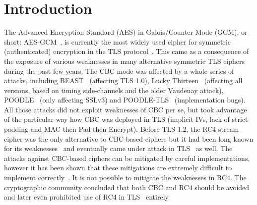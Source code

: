 %

\makeatletter
\def\blfootnote{\xdef\@thefnmark{}\@footnotetext}
\makeatother

%
\section{Introduction}
The Advanced Encryption Standard (AES) in Galois/Counter Mode (GCM), or short: AES-GCM~\cite{gcm,gcm-nist}, is currently the most widely used cipher for symmetric (authenticated) encryption in
the TLS protocol~\cite{rfc5246}.
This came as a consequence of the exposure of various weaknesses in many alternative symmetric TLS ciphers during the past few years.
The CBC mode was affected by a whole series of attacks, including
BEAST~\cite{BEAST} (affecting TLS 1.0), Lucky Thirteen~\cite{Lucky13} (affecting all versions, based on timing side-channels and the older Vaudenay attack), POODLE~\cite{POODLE} (only affecting SSLv3)
and POODLE-TLS~\cite{PoodleAgain} (implementation bugs).
All those attacks did not exploit weaknesses of CBC per se, but took advantage of the particular way how CBC was deployed in TLS (implicit IVs, lack of strict padding and MAC-then-Pad-then-Encrypt).
Before TLS 1.2, the RC4 stream cipher was the only alternative to CBC-based ciphers but
it had been long known for its weaknesses~\cite{SAC:FluManSha01} and eventually came under attack in TLS~\cite{RC4biases} as well.
The attacks against CBC-based ciphers can be mitigated by careful implementations, however it has been
shown that these mitigations are extremely difficult to implement correctly~\cite{somorovsky2016}.
It is not possible to mitigate the weaknesses in RC4.
The cryptographic community concluded that both CBC and RC4 should be avoided and later even prohibited use of RC4 in TLS~\cite{rfc7465} entirely.

